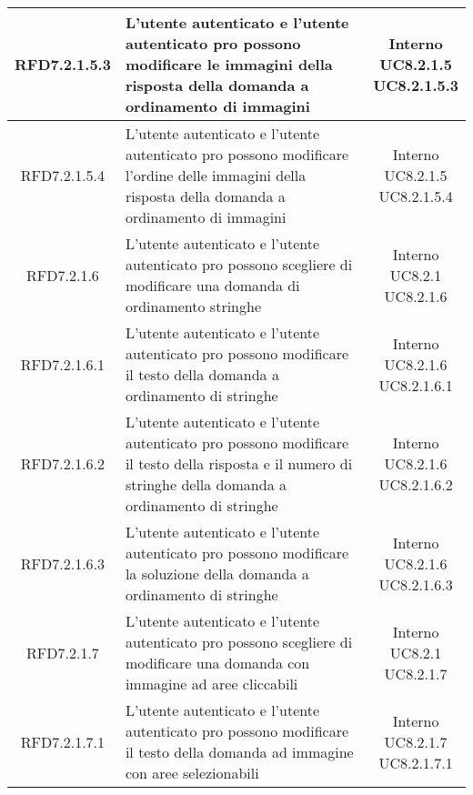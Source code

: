 \begin{longtable}{|c|>{\centering}m{7cm}|c|}
			 \hypertarget{{RFD7.2.1.5.3}}{{RFD7.2.1.5.3}} & L’utente autenticato e l'utente autenticato pro possono modificare le immagini della risposta della domanda a ordinamento di immagini & \makecell{Interno\\ UC8.2.1.5 \\UC8.2.1.5.3 } \\ \hline
			 \hypertarget{{RFD7.2.1.5.4}}{{RFD7.2.1.5.4}} & L’utente autenticato e l'utente autenticato pro possono modificare l’ordine delle immagini della risposta della domanda a ordinamento di immagini & \makecell{Interno\\ UC8.2.1.5 \\UC8.2.1.5.4 } \\ \hline
			 \hypertarget{{RFD7.2.1.6}}{{RFD7.2.1.6}} & L’utente autenticato e l’utente autenticato pro possono scegliere di modificare una domanda di ordinamento stringhe & \makecell{Interno\\ UC8.2.1 \\UC8.2.1.6 } \\ \hline
			 \hypertarget{{RFD7.2.1.6.1}}{{RFD7.2.1.6.1}} & L’utente autenticato e l'utente autenticato pro possono modificare il testo della domanda a ordinamento di stringhe & \makecell{Interno\\ UC8.2.1.6 \\UC8.2.1.6.1 } \\ \hline
			 \hypertarget{{RFD7.2.1.6.2}}{{RFD7.2.1.6.2}} & L’utente autenticato e l'utente autenticato pro possono modificare il testo della risposta e il numero di stringhe della domanda a ordinamento di stringhe & \makecell{Interno\\ UC8.2.1.6 \\UC8.2.1.6.2 } \\ \hline
			 \hypertarget{{RFD7.2.1.6.3}}{{RFD7.2.1.6.3}} & L’utente autenticato e l'utente autenticato pro possono modificare la soluzione della domanda a ordinamento di stringhe & \makecell{Interno\\ UC8.2.1.6 \\UC8.2.1.6.3 } \\ \hline
			 \hypertarget{{RFD7.2.1.7}}{{RFD7.2.1.7}} & L’utente autenticato e l’utente autenticato pro possono scegliere di modificare una domanda con immagine ad aree cliccabili & \makecell{Interno\\ UC8.2.1 \\UC8.2.1.7 } \\ \hline
			 \hypertarget{{RFD7.2.1.7.1}}{{RFD7.2.1.7.1}} & L’utente autenticato e l'utente autenticato pro possono modificare il testo della domanda ad immagine con aree selezionabili & \makecell{Interno\\ UC8.2.1.7 \\UC8.2.1.7.1 } \\ \hline

\end{longtable}
